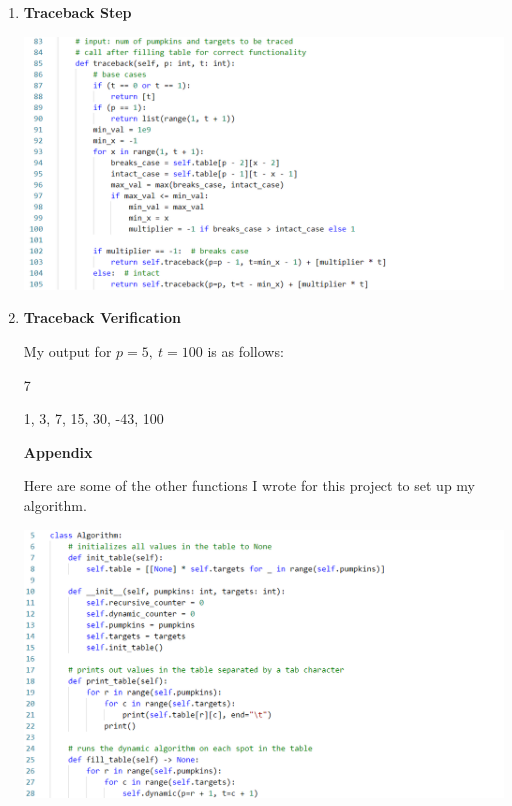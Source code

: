 \documentclass[12pt]{article}
\begin{document}
\begin{enumerate}
    \pagebreak
    \item \textbf{Traceback Step}
    \begin{center}
        \includegraphics[width=5.5in]{traceback.png}
    \end{center}
    \item \textbf{Traceback Verification}
    
    My output for $p = 5,~t=100$ is as follows:

    \hspace{.5in}7

    \hspace{.5in}1, 3, 7, 15, 30, -43, 100     

\pagebreak
\begin{center}
    \textbf{Appendix}
\end{center}
Here are some of the other functions I wrote for this project to set up my algorithm.

\begin{center}
    \includegraphics[width=5.5in]{essentials.png}
\end{center}
\end{enumerate}
\end{document}
